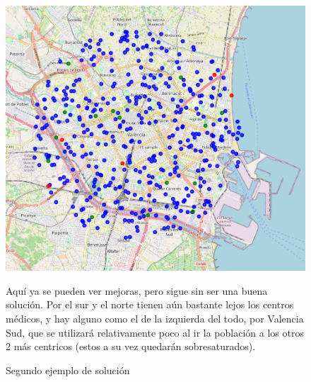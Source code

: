 \documentclass[12pt,a4paper]{book}
\begin{document}
\begin{figure}[H]
    \centering
    \begin{minipage}[c]{0.45\textwidth}
        \includegraphics[width=\textwidth]{images/solucion_ejemplo_2.png}
        \label{fig:ejemplo_2}
    \end{minipage}
    \hfill
    \begin{minipage}[c]{0.45\textwidth}
        Aquí ya se pueden ver mejoras, pero sigue sin ser una buena solución. Por el sur y el norte tienen aún bastante lejos los centros médicos, y hay alguno como el de la izquierda del todo, por Valencia Sud, que se utilizará relativamente poco al ir la población a los otros 2 más centricos (estos a su vez quedarán sobresaturados).
    \end{minipage}
    \caption{Segundo ejemplo de solución}
\end{figure}
\end{document}

